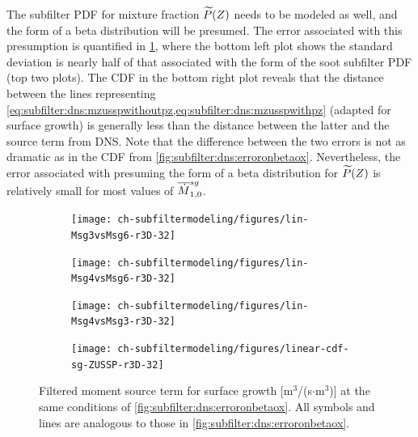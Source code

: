 The subfilter PDF for mixture fraction $\widetilde{P}(Z)$ needs to be modeled as well, and the form of a beta distribution will be presumed. The error associated with this presumption is quantified in \cref{fig:subfilter:dns:erroronbetasg}, where the bottom left plot shows the standard deviation is nearly half of that associated with the form of the soot subfilter PDF (top two plots). The CDF in the bottom right plot reveals that the distance between the lines representing \cref{eq:subfilter:dns:mzusspwithoutpz,eq:subfilter:dns:mzusspwithpz} (adapted for surface growth) is generally less than the distance between the latter and the source term from DNS. Note that the difference between the two errors is not as dramatic as in the CDF from \cref{fig:subfilter:dns:erroronbetaox}. Nevertheless, the error associated with presuming the form of a beta distribution for $\widetilde{P}(Z)$ is relatively small for most values of $\fst[M]{1,0}^{sg}$.


\begin{figure}[ht]
  \centering
  \begin{subfigure}[b]{0.375\linewidth}
    \centering
    \texttt{[image: ch-subfiltermodeling/figures/lin-Msg3vsMsg6-r3D-32]}
  \end{subfigure}%
  \begin{subfigure}[b]{0.375\linewidth}
    \centering
    \texttt{[image: ch-subfiltermodeling/figures/lin-Msg4vsMsg6-r3D-32]}
  \end{subfigure}
  \begin{subfigure}[b]{0.375\linewidth}
    \centering
    \texttt{[image: ch-subfiltermodeling/figures/lin-Msg4vsMsg3-r3D-32]}
  \end{subfigure}%
  \begin{subfigure}[b]{0.375\linewidth}
    \centering
    \texttt{[image: ch-subfiltermodeling/figures/linear-cdf-sg-ZUSSP-r3D-32]}
  \end{subfigure}
  \caption[Error Associated with \texorpdfstring{$\pz = \beta(Z;\tf{Z},\tf{Z_V})$}{P(Z) = B(Z;Z,ZV)} for \texorpdfstring{$\fst[M]{1,0}^{sg}$}{M1,0sg}]{Filtered moment source term for surface growth [m$^3$/(s$\cdot$m$^3$)] at the same conditions of \cref{fig:subfilter:dns:erroronbetaox}. All symbols and lines are analogous to those in \cref{fig:subfilter:dns:erroronbetaox}.}
  \label{fig:subfilter:dns:erroronbetasg}
\end{figure}

